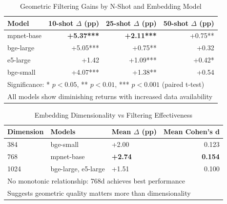\begin{table}[htbp]
\centering
\caption{Geometric Filtering Gains by N-Shot and Embedding Model}
\label{tab:embedding_nshot}
\begin{tabular}{lrrr}
\toprule
\textbf{Model} & \textbf{10-shot $\Delta$ (pp)} & \textbf{25-shot $\Delta$ (pp)} & \textbf{50-shot $\Delta$ (pp)} \\
\midrule
mpnet-base     & \textbf{+5.37***} & \textbf{+2.11***} & +0.75**  \\
bge-large      & +5.05***          & +0.75**           & +0.32    \\
e5-large       & +1.42             & +1.09***          & +0.42*   \\
bge-small      & +4.07***          & +1.38**           & +0.54    \\
\midrule
\multicolumn{4}{l}{\small Significance: * $p<0.05$, ** $p<0.01$, *** $p<0.001$ (paired t-test)} \\
\multicolumn{4}{l}{\small All models show diminishing returns with increased data availability} \\
\bottomrule
\end{tabular}
\end{table}


\begin{table}[htbp]
\centering
\caption{Embedding Dimensionality vs Filtering Effectiveness}
\label{tab:embedding_dimension}
\begin{tabular}{lllr}
\toprule
\textbf{Dimension} & \textbf{Models} & \textbf{Mean $\Delta$ (pp)} & \textbf{Mean Cohen's d} \\
\midrule
384  & bge-small           & +2.00 & 0.123 \\
768  & mpnet-base          & \textbf{+2.74} & \textbf{0.154} \\
1024 & bge-large, e5-large & +1.51 & 0.100 \\
\midrule
\multicolumn{4}{l}{\small No monotonic relationship: 768d achieves best performance} \\
\multicolumn{4}{l}{\small Suggests geometric quality matters more than dimensionality} \\
\bottomrule
\end{tabular}
\end{table}

